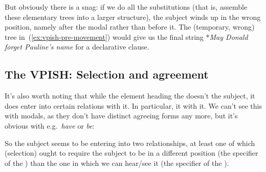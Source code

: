 \documentclass{article}
\begin{document}
But obviously there is a snag: if we do all the substitutions (that is, assemble these elementary trees into a larger structure), the subject winds up in the wrong position, namely after the modal rather than before it. The (temporary, wrong) tree in~(\ref{ex:vpish-pre-movement}) would give us the final string *\emph{May Donald forget Pauline's name} for a declarative clause.
\begin{exe}
     \label{ex:vpish-pre-movement}
\end{exe}

    \subsection{The VPISH: Selection and agreement}
It's also worth noting that while the element heading the  doesn't  the subject, it does enter into certain relations with it.
In particular, it  with it.
We can't see this with modals, as they don't have distinct agreeing forms any more, but it's obvious with e.g.\ \emph{have} or \emph{be}:
\begin{exe}
\end{exe}
So the subject seems to be entering into two relationships, at least one of which (selection) ought to require the subject to be in a different position (the specifier of the ) than the one in which we can hear/see it (the specifier of the ).  
\end{document}
